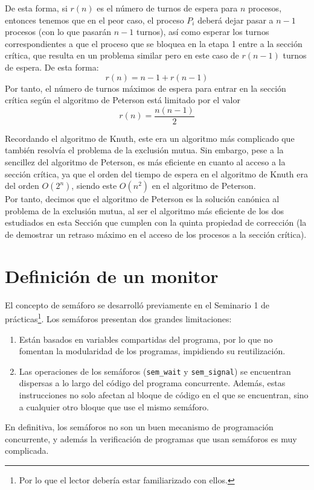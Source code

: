 \begin{description}
        De esta forma, si $r(n)$ es el número de turnos de espera para $n$ procesos, entonces tenemos que en el peor caso, el proceso $P_i$ deberá dejar pasar a $n-1$ procesos (con lo que pasarán $n-1$ turnos), así como esperar los turnos correspondientes a que el proceso que se bloquea en la etapa 1 entre a la sección crítica, que resulta en un problema similar pero en este caso de $r(n-1)$ turnos de espera. De esta forma:
        \begin{equation*}
            r(n) = n-1+r(n-1)
        \end{equation*}
        Por tanto, el número de turnos máximos de espera para entrar en la sección crítica según el algoritmo de Peterson está limitado por el valor
        \begin{equation*}
            r(n) = \dfrac{n(n-1)}{2}
        \end{equation*}
\end{description}

Recordando el algoritmo de Knuth, este era un algoritmo más complicado que también resolvía el problema de la exclusión mutua. Sin embargo, pese a la sencillez del algoritmo de Peterson, es más eficiente en cuanto al acceso a la sección crítica, ya que el orden del tiempo de espera en el algoritmo de Knuth era del orden $O(2^n)$, siendo este $O(n^2)$ en el algoritmo de Peterson.\\

Por tanto, decimos que el algoritmo de Peterson es la solución canónica al problema de la exclusión mutua, al ser el algoritmo más eficiente de los dos estudiados en esta Sección que cumplen con la quinta propiedad de corrección (la de demostrar un retraso máximo en el acceso de los procesos a la sección crítica).


\section{Definición de un monitor}
El concepto de semáforo se desarrolló previamente en el Seminario 1 de prácticas\footnote{Por lo que el lector debería estar familiarizado con ellos.}. Los semáforos presentan dos grandes limitaciones:
\begin{enumerate}
    \item Están basados en variables compartidas del programa, por lo que no fomentan la modularidad de los programas, impidiendo su reutilización.
    \item Las operaciones de los semáforos (\verb|sem_wait| y \verb|sem_signal|) se encuentran dispersas a lo largo del código del programa concurrente. Además, estas instrucciones no solo afectan al bloque de código en el que se encuentran, sino a cualquier otro bloque que use el mismo semáforo.
\end{enumerate}
En definitiva, los semáforos no son un buen mecanismo de programación concurrente, y además la verificación de programas que usan semáforos es muy complicada. 

